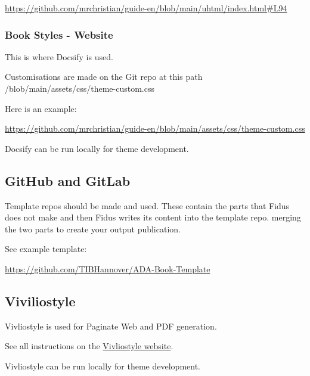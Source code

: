 \documentclass{article}
\begin{document}
\href{https://github.com/mrchristian/guide-en/blob/main/uhtml/index.html#L94}{https://github.com/mrchristian/guide-en/blob/main/uhtml/index.html\#L94}


\subsubsection{Book Styles - Website}\label{H9324092}



This is where Docsify is used.


Customisations are made on the Git repo at this path /blob/main/assets/css/theme-custom.css


Here is an example:


\href{https://github.com/mrchristian/guide-en/blob/main/assets/css/theme-custom.css}{https://github.com/mrchristian/guide-en/blob/main/assets/css/theme-custom.css}


Docsify can be run locally for theme development.


\subsection{GitHub and GitLab}\label{H4369621}



Template repos should be made and used. These contain the parts that Fidus does not make and then Fidus writes its content into the template repo. merging the two parts to create your output publication.


See example template:


\href{https://github.com/TIBHannover/ADA-Book-Template}{https://github.com/TIBHannover/ADA-Book-Template}


\subsection{Viviliostyle}\label{H3472256}



Vivliostyle is used for Paginate Web and PDF generation.


See all instructions on the \href{https://vivliostyle.org/getting-started/}{Vivliostyle website}.


Vivliostyle can be run locally for theme development.
\end{document}
